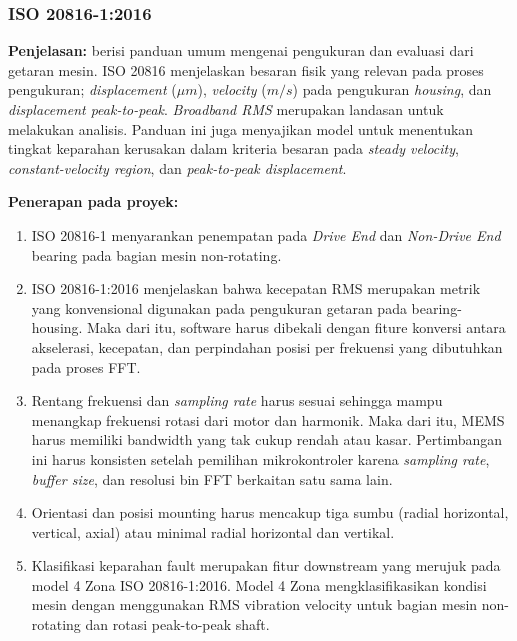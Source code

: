 \documentclass{elsinta}
\begin{document}
\subsubsection{ISO 20816-1:2016}
\textbf{Penjelasan:} 
\cite{BritishStandardsInstitution2016} berisi panduan umum mengenai pengukuran dan evaluasi dari getaran mesin. ISO 20816 menjelaskan besaran fisik yang relevan pada proses pengukuran; \textit{displacement} ($\mu m$),\textit{ velocity} ($m/s$) pada pengukuran \textit{housing}, dan \textit{displacement peak-to-peak}. \textit{Broadband RMS} merupakan landasan untuk melakukan analisis. Panduan ini juga menyajikan model untuk menentukan tingkat keparahan kerusakan dalam kriteria besaran pada \textit{steady velocity}, \textit{constant-velocity region}, dan \textit{peak-to-peak displacement}.

\textbf{Penerapan pada proyek:} 
\begin{enumerate}
    \item ISO 20816-1 menyarankan penempatan pada \textit{Drive End} dan \textit{Non-Drive End} bearing pada bagian mesin non-rotating.
    \item ISO 20816-1:2016 menjelaskan bahwa kecepatan RMS merupakan metrik yang konvensional digunakan pada pengukuran getaran pada bearing-housing. Maka dari itu, software harus dibekali dengan fiture konversi antara akselerasi, kecepatan, dan perpindahan posisi per frekuensi  yang dibutuhkan pada proses FFT.
    \item Rentang frekuensi dan \textit{sampling rate} harus sesuai sehingga mampu menangkap frekuensi rotasi dari motor dan harmonik. Maka dari itu, MEMS harus memiliki bandwidth yang tak cukup rendah atau kasar. Pertimbangan ini harus konsisten setelah pemilihan mikrokontroler karena \textit{sampling rate}, \textit{buffer size}, dan resolusi bin FFT berkaitan satu sama lain.
    \item Orientasi dan posisi mounting harus mencakup tiga sumbu (radial horizontal, vertical, axial) atau minimal radial horizontal dan vertikal.
    \item Klasifikasi keparahan fault merupakan fitur downstream yang merujuk pada model 4 Zona ISO 20816-1:2016. Model 4 Zona mengklasifikasikan kondisi mesin dengan menggunakan RMS vibration velocity untuk bagian mesin non-rotating dan rotasi peak-to-peak shaft.
\end{enumerate}
\end{document}
